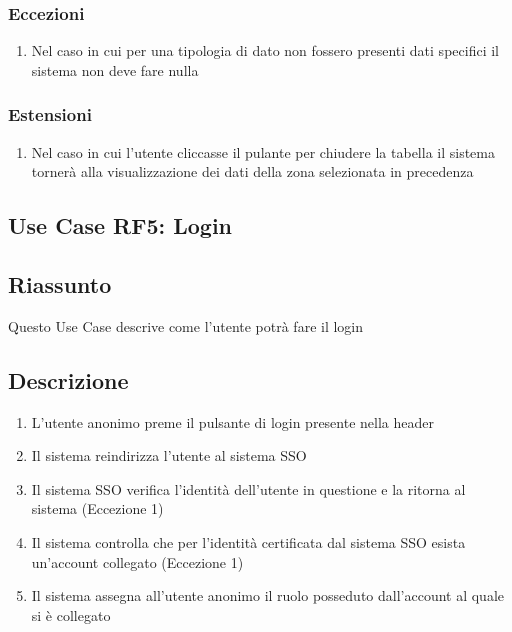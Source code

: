         \subsubsection{Eccezioni}
            \begin{enumerate}
                \item Nel caso in cui per una tipologia di dato non fossero presenti dati specifici il sistema non deve fare nulla
            \end{enumerate}
        \subsubsection{Estensioni}
            \begin{enumerate}
                \item Nel caso in cui l'utente cliccasse il pulante per chiudere la tabella il sistema tornerà alla visualizzazione dei dati della zona selezionata in precedenza
            \end{enumerate}

    \subsection{Use Case RF5: Login}
        \subsection{Riassunto}
            Questo Use Case descrive come l'utente potrà fare il login
        \subsection{Descrizione}
            \begin{enumerate}
                \item L'utente anonimo preme il pulsante di login presente nella header
                \item Il sistema reindirizza l'utente al sistema SSO
                \item Il sistema SSO verifica l'identità dell'utente in questione e la ritorna al sistema (Eccezione 1)
                \item Il sistema controlla che per l'identità certificata dal sistema SSO esista un'account collegato (Eccezione 1)
                \item Il sistema assegna all'utente anonimo il ruolo posseduto dall'account al quale si è collegato
            \end{enumerate}

